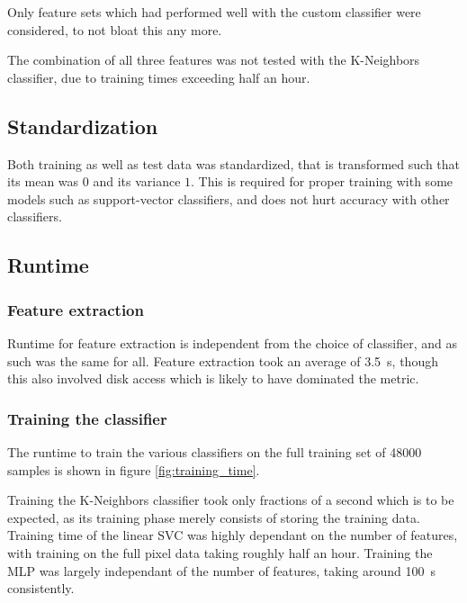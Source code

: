 \documentclass[a4paper]{scrreprt}
\begin{document}
Only feature sets which had performed well with the custom classifier were
considered, to not bloat this any more.

The combination of all three features was not tested with the K-Neighbors
classifier, due to training times exceeding half an hour.

\subsection{Standardization}

Both training as well as test data was standardized, that is transformed such
that its mean was $0$ and its variance $1$. This is required for proper
training with some models such as support-vector classifiers, and does not hurt
accuracy with other classifiers.

\subsection{Runtime}

\subsubsection{Feature extraction}

Runtime for feature extraction is independent from the choice of classifier,
and as such was the same for all. Feature extraction took an average of
\SI{3.5}{\s}, though this also involved disk access which is likely to have
dominated the metric.

\subsubsection{Training the classifier}

The runtime to train the various classifiers on the full training set of 48000
samples is shown in figure \ref{fig:training_time}.

Training the K-Neighbors classifier took only fractions of a second which is to
be expected, as its training phase merely consists of storing the training
data. Training time of the linear SVC was highly dependant on the number of
features, with training on the full pixel data taking roughly half an hour.
Training the MLP was largely independant of the number of features, taking
around \SI{100}{\s} consistently.
\end{document}
